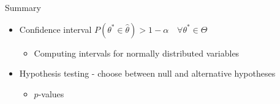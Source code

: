 \documentclass{beamer}
\begin{document}
\begin{frame}{Summary}
\begin{itemize} 
 \item Confidence interval  $P(\theta^* \in \hat{\theta}) > 1 - \alpha \quad \forall \theta^* \in \Theta $
 \begin{itemize}
 \item Computing intervals for normally distributed variables 
  \end{itemize}
 \item Hypothesis testing - choose between null and alternative hypotheses 
  \begin{itemize}
 \item $p$-values 
  \end{itemize}
\end{itemize}
\end{frame}
\end{document}
